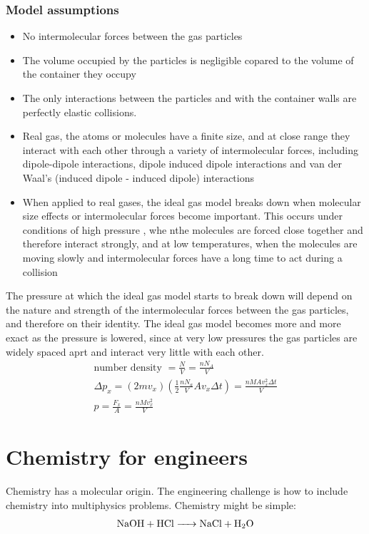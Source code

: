 \subsubsection{Model assumptions}
\begin{itemize}
	\item No intermolecular forces between the gas particles
	\item The volume occupied by the particles is negligible copared to the volume of the container they occupy
	\item The only interactions between the particles and with the container walls are perfectly elastic collisions. 
	\item Real gas, the atoms or molecules have a finite size, and at close range they interact with each other through a variety of intermolecular forces, including dipole-dipole interactions, dipole induced dipole interactions and van der Waal's (induced dipole - induced dipole) interactions
	\item When applied to real gases, the ideal gas model breaks down when molecular size effects or intermolecular forces become important. This occurs under conditions of high pressure , whe nthe molecules are forced close together and therefore interact strongly, and at low temperatures, when the molecules are moving slowly and intermolecular forces have a long time to act during a collision
\end{itemize}
The pressure at which the ideal gas model starts to break down will depend on the nature and strength of the intermolecular forces between the gas particles, and therefore on their identity. The ideal gas model becomes more and more exact as the pressure is lowered, since at very low pressures the gas particles are widely spaced aprt and interact very little with each other.
\begin{gather}
	\textrm{number density } = \frac{N}{V} = \frac{nN_A}{V}\\
	\Delta p_x = \left(2mv_x\right)\left(\frac{1}{2}\frac{nN_a}{V}Av_x \Delta t\right) = \frac{nMAv_x^2 \Delta t}{V}\\
	p = \frac{F_x}{A} = \frac{nMv_x^2}{V}
\end{gather}
\section{Chemistry for engineers}
Chemistry has a molecular origin. The engineering challenge is how to include chemistry into multiphysics problems. Chemistry might be simple:
\begin{gather}
	\ce{NaOH + HCl -> NaCl + H2O}
\end{gather}